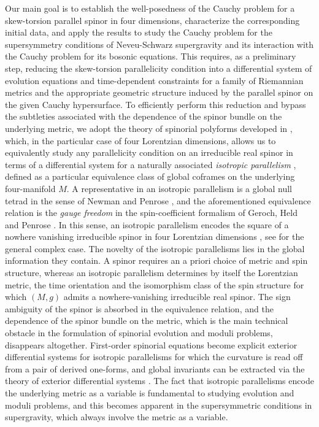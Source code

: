 \documentclass[10pt,reqno,a4paper]{amsart}
\theoremstyle{plain}
\theoremstyle{definition}
\theoremstyle{remark}
\theoremstyle{remark}
\renewcommand{\(}{ (}
\renewcommand{\)}{ )}
\begin{document}
Our main goal is to establish the well-posedness of the Cauchy problem for a skew-torsion parallel spinor in four dimensions, characterize the corresponding initial data, and apply the results to study the Cauchy problem for the supersymmetry conditions of Neveu-Schwarz supergravity \cite{Ortin} and its interaction with the Cauchy problem for its bosonic equations. This requires, as a preliminary step, reducing the skew-torsion parallelicity condition into a differential system of evolution equations and time-dependent constraints for a family of Riemannian metrics and the appropriate geometric structure induced by the parallel spinor on the given Cauchy hypersurface. To efficiently perform this reduction and bypass the subtleties associated with the dependence of the spinor bundle on the underlying metric, we adopt the theory of spinorial polyforms developed in \cite{Cortes:2019xmk}, which, in the particular case of four Lorentzian dimensions, allows us to equivalently study any parallelicity condition on an irreducible real spinor in terms of a differential system for a naturally associated \emph{isotropic parallelism} \cite{ShahbaziTesis}, defined as a particular equivalence class of global coframes on the underlying four-manifold $M$. A representative in an isotropic parallelism is a global null tetrad in the sense of Newman and Penrose \cite{NewmanPenrose}, and the aforementioned equivalence relation is the \emph{gauge freedom} in the spin-coefficient formalism of Geroch, Held and Penrose \cite{GerochHeldPenrose}. In this sense, an isotropic parallelism encodes the square \cite{Atiyah} of a nowhere vanishing irreducible spinor in four Lorentzian dimensions \cite{Cortes:2019xmk}, see \cite{GilGarciaShahbazi} for the general complex case. The novelty of the isotropic parallelisms lies in the global information they contain. A spinor requires an a priori choice of metric and spin structure, whereas an isotropic parallelism determines by itself the Lorentzian metric, the time orientation and the isomorphism class of the spin structure for which $(M,g)$ admits a nowhere-vanishing irreducible real spinor. The sign ambiguity of the spinor is absorbed in the equivalence relation, and the dependence of the spinor bundle on the metric, which is the main technical obstacle in the formulation of spinorial evolution and moduli problems, disappears altogether. First-order spinorial equations become explicit exterior differential systems for isotropic parallelisms for which the curvature is read off from a pair of derived one-forms, and global invariants can be extracted via the theory of exterior differential systems \cite{BryantBook}. The fact that isotropic parallelisms encode the underlying metric as a variable is fundamental to studying evolution and moduli problems, and this becomes apparent in the supersymmetric conditions in supergravity, which always involve the metric as a variable.\medskip
\end{document}
